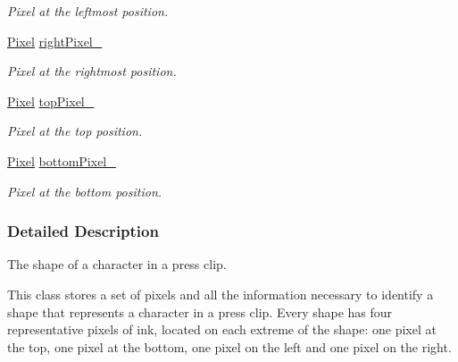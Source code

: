 \begin{CompactItemize}
\begin{CompactList}\small\item\em Pixel at the leftmost position. \item\end{CompactList}\item 
\hypertarget{class_shape_16adfccce492a7a0e34c5ade941c32fd}{
\hyperlink{_shape_8hpp_535e59456e3e633842529cfa8ea103c4}{Pixel} \hyperlink{class_shape_16adfccce492a7a0e34c5ade941c32fd}{rightPixel\_\-}}
\label{class_shape_16adfccce492a7a0e34c5ade941c32fd}

\begin{CompactList}\small\item\em Pixel at the rightmost position. \item\end{CompactList}\item 
\hypertarget{class_shape_c6755e0dbd9d2eaf537e232fd003c918}{
\hyperlink{_shape_8hpp_535e59456e3e633842529cfa8ea103c4}{Pixel} \hyperlink{class_shape_c6755e0dbd9d2eaf537e232fd003c918}{topPixel\_\-}}
\label{class_shape_c6755e0dbd9d2eaf537e232fd003c918}

\begin{CompactList}\small\item\em Pixel at the top position. \item\end{CompactList}\item 
\hypertarget{class_shape_8277820de6ff8da989a0659f4e5d82d1}{
\hyperlink{_shape_8hpp_535e59456e3e633842529cfa8ea103c4}{Pixel} \hyperlink{class_shape_8277820de6ff8da989a0659f4e5d82d1}{bottomPixel\_\-}}
\label{class_shape_8277820de6ff8da989a0659f4e5d82d1}

\begin{CompactList}\small\item\em Pixel at the bottom position. \item\end{CompactList}\end{CompactItemize}


\subsubsection{Detailed Description}
The shape of a character in a press clip. 

This class stores a set of pixels and all the information necessary to identify a shape that represents a character in a press clip. Every shape has four representative pixels of ink, located on each extreme of the shape: one pixel at the top, one pixel at the bottom, one pixel on the left and one pixel on the right.

